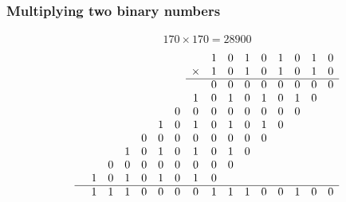 \documentclass[10pt]{beamer}
\begin{document}
\begin{frame}
    \frametitle{Multiplying two binary numbers}
    \begin{align*}
        170 \times 170 = 28900
    \end{align*}
    \pause
    \begin{align*}
        \begin{array}{cccccccccccccccc}
                &&&&&&&& 1 & 0 & 1 & 0 & 1 & 0 & 1 & 0 \\
          &&&&&&&\times& 1 & 0 & 1 & 0 & 1 & 0 & 1 & 0 \\
            \cline{8-16}
               &&&&&&&& 0 & 0 & 0 & 0 & 0 & 0 & 0 & 0 \\
                &&&&&&& 1 & 0 & 1 & 0 & 1 & 0 & 1 & 0 & \\
                 &&&&&& 0 & 0 & 0 & 0 & 0 & 0 & 0 & 0 &&\\
                  &&&&& 1 & 0 & 1 & 0 & 1 & 0 & 1 & 0 &&\\
                   &&&& 0 & 0 & 0 & 0 & 0 & 0 & 0 & 0 &&\\
                    &&& 1 & 0 & 1 & 0 & 1 & 0 & 1 & 0 &&\\
                     && 0 & 0 & 0 & 0 & 0 & 0 & 0 & 0 &&\\
                      & 1 & 0 & 1 & 0 & 1 & 0 & 1 & 0 &&\\
            \hline
            & 1 & 1 & 1 & 0 & 0 & 0 & 0 & 1 & 1 & 1 & 0 & 0 & 1 & 0 & 0
        \end{array}
    \end{align*}
\end{frame}
\end{document}

